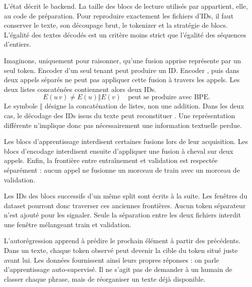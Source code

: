 L'état décrit le backend. La taille des blocs de lecture utilisés par
 appartient, elle, au code de préparation.
Pour reproduire exactement les fichiers d'IDs, il faut conserver le texte,
son découpage brut, le tokenizer et la stratégie de blocs.
L'égalité des textes décodés est un critère moins strict que l'égalité
des séquences d'entiers.

Imaginons, uniquement pour raisonner, qu'une fusion apprise représente
 par un seul token. Encoder  d'un seul tenant peut
produire un ID. Encoder , puis  dans deux appels séparés
ne peut pas appliquer cette fusion à travers les appels.
Les deux listes concaténées contiennent alors deux IDs.
\[
    E(u\,v)\ne E(u)\mathbin{\Vert}E(v)
    \quad\text{peut se produire avec BPE.}
\]
Le symbole \(\Vert\) désigne la concaténation de listes, non une addition.
Dans les deux cas, le décodage des IDs issus du texte peut reconstituer
. Une représentation différente n'implique donc pas nécessairement
une information textuelle perdue.

Les blocs d'apprentissage interdisent certaines fusions lors de leur acquisition.
Les blocs d'encodage interdisent ensuite d'appliquer une fusion à cheval
sur deux appels. Enfin, la frontière entre entraînement et validation est
respectée séparément : aucun appel ne fusionne un morceau de train avec
un morceau de validation.

Les IDs des blocs successifs d'un même split sont écrits à la suite.
Les fenêtres du dataset pourront donc traverser ces anciennes frontières.
Aucun token séparateur n'est ajouté pour les signaler. Seule la séparation
entre les deux fichiers interdit une fenêtre mélangeant train et validation.


L'autorégression apprend à prédire le prochain élément à partir des précédents.
Dans un texte, chaque token observé peut devenir la cible du token situé
juste avant lui. Les données fournissent ainsi leurs propres réponses :
on parle d'apprentissage auto-supervisé. Il ne s'agit pas de demander à un
humain de classer chaque phrase, mais de réorganiser un texte déjà disponible.

